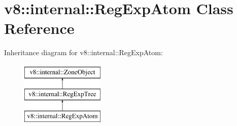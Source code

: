 \hypertarget{classv8_1_1internal_1_1RegExpAtom}{}\section{v8\+:\+:internal\+:\+:Reg\+Exp\+Atom Class Reference}
\label{classv8_1_1internal_1_1RegExpAtom}
Inheritance diagram for v8\+:\+:internal\+:\+:Reg\+Exp\+Atom\+:\begin{figure}[H]
\begin{center}
\leavevmode
\includegraphics[height=3.000000cm]{classv8_1_1internal_1_1RegExpAtom}
\end{center}
\end{figure}
